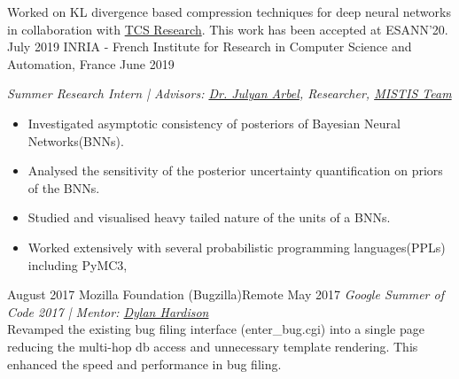 \begin{experiences}
{    Worked on KL divergence based compression techniques for deep neural networks in collaboration with \href{https://www.tcs.com/tcs-research}{TCS Research}. This work has been accepted at ESANN'20.
    }
  \emptySeparator
   \researchexperience
    {July 2019}   {INRIA - French Institute for Research in Computer Science and Automation, France}{}{}
    {June 2019} {\textit{Summer Research Intern | Advisors: \href{https://www.julyanarbel.com}{Dr. Julyan Arbel}, Researcher, \href{https://team.inria.fr/mistis/}{MISTIS Team}}
        \begin{itemize}
            \item Investigated asymptotic consistency of posteriors of Bayesian Neural Networks(BNNs). 
            \item Analysed the sensitivity of the posterior uncertainty quantification on priors of the BNNs.
            \item Studied and visualised heavy tailed nature of the units of a BNNs.
            \item Worked extensively with several probabilistic programming languages(PPLs) including PyMC3,
        \end{itemize}
    }
  \emptySeparator
    
   \researchexperience
    {August 2017}   {Mozilla Foundation (Bugzilla)}{}{Remote}
    {May 2017} {\textit{Google Summer of Code 2017 | Mentor: \href{https://www.linkedin.com/in/dylanwh}{Dylan Hardison}}\\
    Revamped the existing bug filing interface (enter\_bug.cgi) into a single page reducing the multi-hop db access and unnecessary template rendering. This enhanced the speed and performance in bug filing.
                    }
  
\end{experiences}
\vspace{-4mm}
